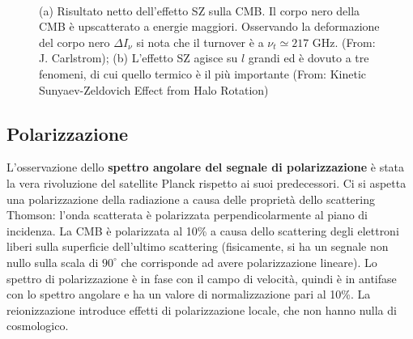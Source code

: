 \begin{figure}[H]
    $\;\;$
    \caption{(a) Risultato netto dell'effetto SZ sulla CMB. Il corpo nero della CMB è upscatterato a energie maggiori. Osservando la deformazione del corpo nero $\Delta I_\nu$ si nota che il turnover è a $\nu_t \simeq 217$ GHz.  (From: J. Carlstrom); (b) L'effetto SZ agisce su $l$ grandi ed è dovuto a tre fenomeni, di cui quello termico è il più importante (From: Kinetic Sunyaev-Zeldovich Effect from Halo Rotation)} \label{fig11:sz} 
\end{figure}


\subsection{Polarizzazione}
L'osservazione dello \textbf{spettro angolare del segnale di polarizzazione} è stata la vera rivoluzione del satellite Planck rispetto ai suoi predecessori. Ci si aspetta una polarizzazione della radiazione a causa delle proprietà dello scattering Thomson: l'onda scatterata è polarizzata perpendicolarmente al piano di incidenza. La CMB è polarizzata al 10\% a causa dello scattering degli elettroni liberi sulla superficie dell'ultimo scattering (fisicamente, si ha un segnale non nullo sulla scala di $90^\circ$ che corrisponde ad avere polarizzazione lineare). Lo spettro di polarizzazione è in fase con il campo di velocità, quindi è in antifase con lo spettro angolare e ha un valore di normalizzazione pari al 10\%. La reionizzazione introduce effetti di polarizzazione locale, che non hanno nulla di cosmologico. 

